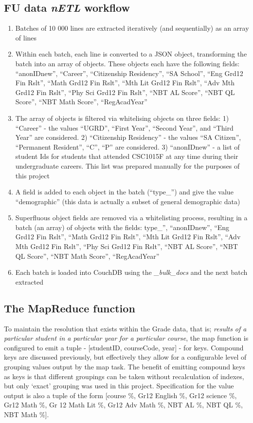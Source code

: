\subsection*{FU data \textit{nETL} workflow}
\begin{enumerate}
    \item Batches of 10 000 lines are extracted iteratively (and sequentially) as an array of lines
    \item Within each batch, each line is converted to a JSON object, transforming the batch into an array of objects. These objects each have the following fields: ``anonIDnew'', ``Career'', ``Citizenship Residency'', ``SA School'', ``Eng Grd12 Fin Rslt'', ``Math Grd12 Fin Rslt'', ``Mth Lit Grd12 Fin Rslt'', ``Adv Mth Grd12 Fin Rslt'', ``Phy Sci Grd12 Fin Rslt'', ``NBT AL Score'', ``NBT QL Score'', ``NBT Math Score'', ``RegAcadYear''
    \item The array of objects is filtered via whitelising objects on three fields: 1) ``Career'' - the values ``UGRD'', ``First Year'', ``Second Year'', and ``Third Year'' are considered. 2) ``Citizenship Residency'' - the values ``SA Citizen'', ``Permanent Resident'', ``C'', ``P'' are considered. 3) ``anonIDnew'' - a list of student Ids for students that attended CSC1015F at any time during their undergraduate careers. This list was prepared manually for the purposes of this project
    \item A field is added to each object in the batch (``type\_'') and give the value ``demographic'' (this data is actually a subset of general demographic data)
    \item Superfluous object fields are removed via a whitelisting process, resulting in a batch (an array) of objects with the fields: type\_'', ``anonIDnew'', ``Eng Grd12 Fin Rslt'', ``Math Grd12 Fin Rslt'', ``Mth Lit Grd12 Fin Rslt'', ``Adv Mth Grd12 Fin Rslt'', ``Phy Sci Grd12 Fin Rslt'', ``NBT AL Score'', ``NBT QL Score'', ``NBT Math Score'', ``RegAcadYear''
    \item Each batch is loaded into CouchDB using the \textit{\_bulk\_docs} and the next batch extracted
\end{enumerate}

\subsection*{The MapReduce function}
To maintain the resolution that exists within the Grade data, that is; \textit{results of a particular student in a particular year for a particular course}, the map function is configured to emit a tuple - [studentID, courseCode, year] - for keys. Compound keys are discussed previously, but effectively they allow for a configurable level of grouping values output by the map task. The benefit of emitting compound keys as keys is that different groupings can be taken without recalculation of indexes, but only `exact' grouping was used in this project. Specification for the value output is also a tuple of the form [course \%, Gr12 English \%, Gr12 science \%, Gr12 Math \%, Gr 12 Math Lit \%, Gr12 Adv Math \%, NBT AL \%, NBT QL \%, NBT Math \%].


